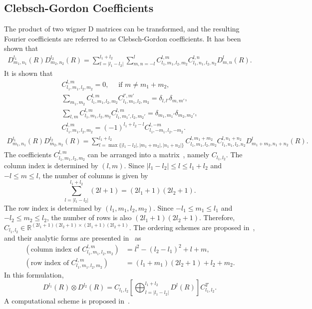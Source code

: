 \documentclass[onecolumn,11pt]{IEEEtran}
\newcommand{\bracket}[1]{\ensuremath{\left[ #1 \right]}}
\renewcommand{\Re}{\ensuremath{\mathbb{R}}}
\begin{document}
\subsection{Clebsch-Gordon Coefficients}

The product of two wigner D matrices can be transformed, and the resulting Fourier coefficients are referred to as Clebsch-Gordon coefficients. 
It has been shown that
\begin{align}
    D^{l_1}_{m_1,n_1} (R) D^{l_2}_{m_2,n_2}(R) = \sum_{l=|l_1-l_2|}^{l_1+l_2} \sum_{m,n=-l}^l C^{l,m}_{l_1,m_1,l_2,m_2} C^{l,n}_{l_1,n_1,l_2,n_2} D^{l}_{m,n}(R).
\end{align}
It is shown that
\begin{gather*}
    C^{l,m}_{l_1,m_1,l_2,m_2} = 0,\quad \text{ if } m \neq m_1 + m_2,\\
    \sum_{m_1,m_2} C^{l,m}_{l_1,m_1,l_2,m_2} C^{l',m'}_{l_1,m_1,l_2,m_2} = \delta_{l,l'}\delta_{m,m'},\\
    \sum_{l,m} C^{l,m}_{l_1,m_1,l_2,m_2} C^{l,m}_{l_1,m_1',l_2,m_2'} = \delta_{m_1,m_1'}\delta_{m_2,m_2'},\\
    C^{l,m}_{l_1,m_1,l_2,m_2} = (-1)^{l_1+l_2-l} C^{l,-m}_{l_1,-m_1,l_2,-m_2}.
\end{gather*}
\begin{align}
    D^{l_1}_{m_1,n_1} (R) D^{l_2}_{m_2,n_2}(R) = \sum_{l=\max\{|l_1-l_2|,|m_1+m_2|,|n_1+n_2|\}}^{l_1+l_2} C^{l,m_1+m_2}_{l_1,m_1,l_2,m_2} C^{l,n_1+n_2}_{l_1,n_1,l_2,n_2} D^{l}_{m_1+m_2,n_1+n_2}(R).
\end{align}
The coefficients $C^{l,m}_{l_1,m_1,l_2,m_2}$ can be arranged into a matrix~\cite{MarPec11}, namely $C_{l_1,l_2}$. 
The column index is determined by $(l,m)$. 
Since $|l_1-l_2|\leq l \leq l_1+l_2$ and $-l\leq m \leq l$, the number of columns is given by
\[
    \sum_{l=|l_1-l_2|}^{l_1+l_2} (2l+1) = (2l_1+1)(2l_2+1).
\]
The row index is determined by $(l_1,m_1,l_2,m_2)$. 
Since $-l_1\leq m_1 \leq l_1$ and $-l_2\leq m_2\leq l_2$, the number of rows is also $(2l_1+1)(2l_2+1)$. 
Therefore, $C_{l_1,l_2} \in \Re^{(2l_1+1)(2l_2+1)\times(2l_1+1)(2l_2+1)}$.
The ordering schemes are proposed in~\cite{MarPec11}, and their analytic forms are presented in~\cite{Dif17} as
\begin{align*}
    (\text{column index of } C^{l,m}_{l_1,m_1,l_2,m_2}) &= l^2-(l_2-l_1)^2 + l + m,\\
    (\text{row index of } C^{l,m}_{l_1,m_1,l_2,m_2}) &= (l_1+m_1)(2l_2+1) + l_2+m_2.
\end{align*}
In this formulation, 
\begin{equation}
    D^{l_1}(R) \otimes D^{l_2}(R) = C_{l_1,l_2} \bracket{ \bigoplus_{l=|l_1-l_2|}^{l_1+l_2} D^l(R)} C_{l_1,l_2}^T.\label{eqn:Clebsch_Gordon}
\end{equation}
A computational scheme is proposed in~\cite{Str14}. 
\end{document}

